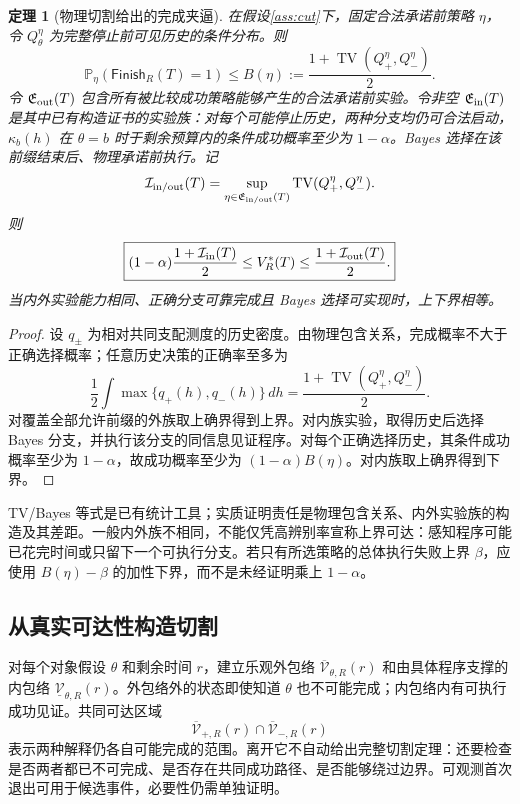 \documentclass[11pt,a4paper,fontset=fandol]{ctexart}
\newtheorem{theorem}{定理}[section]
\theoremstyle{definition}
\theoremstyle{remark}
\numberwithin{equation}{section}
\newcommand{\Pp}{\mathbb P}
\newcommand{\TV}{\operatorname{TV}}
\newcommand{\Finish}{\mathsf{Finish}}
\begin{document}
\begin{theorem}[物理切割给出的完成夹逼]
\label{thm:cut}
在假设\ref{ass:cut}下，固定合法承诺前策略 $\eta$，令 $Q_\theta^\eta$ 为完整停止前可见历史的条件分布。则
\begin{equation}
 \Pp_\eta(\Finish_R(T)=1)
 \le B(\eta):=\frac{1+\TV(Q_+^\eta,Q_-^\eta)}2.
 \label{eq:bayes-upper}
\end{equation}
令 $\mathfrak E_{\rm out}(T)$ 包含所有被比较成功策略能够产生的合法承诺前实验。令非空 $\mathfrak E_{\rm in}(T)$ 是其中已有构造证书的实验族：对每个可能停止历史，两种分支均仍可合法启动，$\kappa_b(h)$ 在 $\theta=b$ 时于剩余预算内的条件成功概率至少为 $1-\alpha$。Bayes 选择在该前缀结束后、物理承诺前执行。记
\begin{equation}
 \mathcal I_{\rm in/out}(T)=
 \sup_{\eta\in\mathfrak E_{\rm in/out}(T)}
 \TV(Q_+^\eta,Q_-^\eta).
\end{equation}
则
\begin{equation}
 \boxed{
 (1-\alpha)\frac{1+\mathcal I_{\rm in}(T)}2
 \le V_R^*(T)
 \le\frac{1+\mathcal I_{\rm out}(T)}2.}
 \label{eq:cut-bracket}
\end{equation}
当内外实验能力相同、正确分支可靠完成且 Bayes 选择可实现时，上下界相等。
\end{theorem}
\begin{proof}
设 $q_\pm$ 为相对共同支配测度的历史密度。由物理包含关系，完成概率不大于正确选择概率；任意历史决策的正确率至多为
\[
 \frac12\int\max\{q_+(h),q_-(h)\}\,dh
 =\frac{1+\TV(Q_+^\eta,Q_-^\eta)}2.
\]
对覆盖全部允许前缀的外族取上确界得到上界。对内族实验，取得历史后选择 Bayes 分支，并执行该分支的同信息见证程序。对每个正确选择历史，其条件成功概率至少为 $1-\alpha$，故成功概率至少为 $(1-\alpha)B(\eta)$。对内族取上确界得到下界。
\end{proof}

TV/Bayes 等式是已有统计工具；实质证明责任是物理包含关系、内外实验族的构造及其差距。一般内外族不相同，不能仅凭高辨别率宣称上界可达：感知程序可能已花完时间或只留下一个可执行分支。若只有所选策略的总体执行失败上界 $\beta$，应使用 $B(\eta)-\beta$ 的加性下界，而不是未经证明乘上 $1-\alpha$。

\subsection{从真实可达性构造切割}
对每个对象假设 $\theta$ 和剩余时间 $r$，建立乐观外包络 $\overline{\mathcal V}_{\theta,R}(r)$ 和由具体程序支撑的内包络 $\underline{\mathcal V}_{\theta,R}(r)$。外包络外的状态即使知道 $\theta$ 也不可能完成；内包络内有可执行成功见证。共同可达区域
\begin{equation}
 \overline{\mathcal V}_{+,R}(r)\cap
 \overline{\mathcal V}_{-,R}(r)
 \label{eq:common-viable}
\end{equation}
表示两种解释仍各自可能完成的范围。离开它不自动给出完整切割定理：还要检查是否两者都已不可完成、是否存在共同成功路径、是否能够绕过边界。可观测首次退出可用于候选事件，必要性仍需单独证明。
\end{document}

